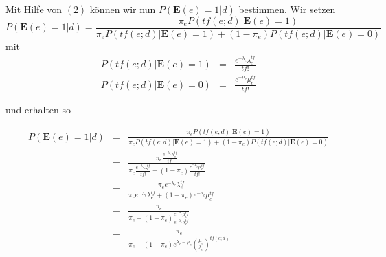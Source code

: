 Mit Hilfe von $(2)$ können wir nun $P(\textbf{E}(e)=1|d)$ bestimmen. Wir setzen
\[ P(\textbf{E}(e)=1|d) = \frac{\pi_e P(tf(e;d)|\textbf{E}(e)=1)}{\pi_e P(tf(e;d)|\textbf{E}(e)=1) + (1-\pi_e) P(tf(e;d)|\textbf{E}(e)=0)} \]
mit
\begin{eqnarray*}
	P(tf(e;d)|\textbf{E}(e)=1) &=& \frac{e^{-\lambda_e}\lambda_e^{tf}}{tf!}\\
	P(tf(e;d)|\textbf{E}(e)=0) &=& \frac{e^{-\mu_e}\mu_e^{tf}}{tf!}
\end{eqnarray*}

und erhalten so

\begin{eqnarray*}
	P(\textbf{E}(e)=1|d) 	&=& 	\frac{\pi_e P(tf(e;d)|\textbf{E}(e)=1)}{\pi_e P(tf(e;d)|\textbf{E}(e)=1) + (1-\pi_e) P(tf(e;d)|\textbf{E}(e)=0)} \\
	&=&	\frac{\pi_e \frac{e^{-\lambda_e}\lambda_e^{tf}}{tf!}}{\pi_e \frac{e^{-\lambda_e}\lambda_e^{tf}}{tf!} + (1 - \pi_e) \frac{e^{-\mu_e}\mu_e^{tf}}{tf!}}\\
	&=&	\frac{\pi_e{e^{-\lambda_e}\lambda_e^{tf}}}{\pi_e {e^{-\lambda_e}\lambda_e^{tf}} + (1 - \pi_e) e^{-\mu_e}\mu_e^{tf}}\\
	&=&	\frac{\pi_e}{\pi_e + (1-\pi_e)\frac{e^{-\mu_e}\mu_e^{tf}}{e^{-\lambda_e}\lambda_e^{tf}}}\\
	&=&	\frac{\pi_e}{\pi_e + (1-\pi_e)e^{\lambda_e - \mu_e}\left( \frac{\mu_e}{\lambda_e}\right)^{tf(e;d)}}	
\end{eqnarray*}


